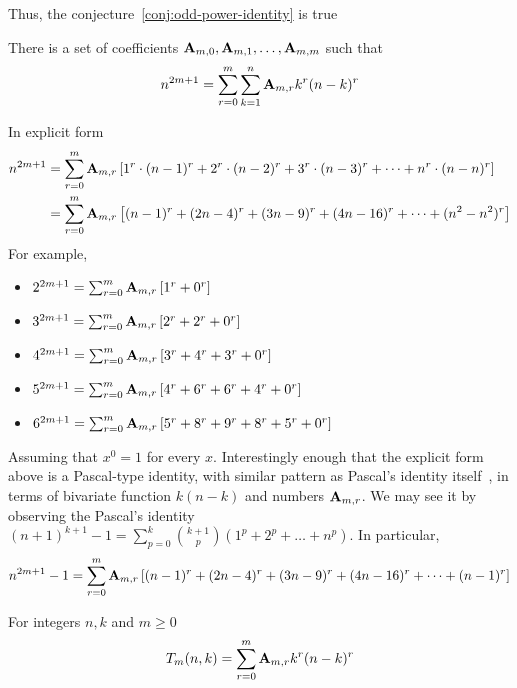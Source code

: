 Thus, the conjecture~\eqref{conj:odd-power-identity} is true

\begin{theorem}
    \label{theorem:odd-power-identity}
    There is a set of coefficients ${\mathbf{A}} \sb{m,0}, {\mathbf{A}} \sb{m,1}, \ldots, {\mathbf{A}} \sb{m,m}$ such that
    \begin{align*}
        n^{2m+1} = \sum_{r=0}^{m} \sum_{k=1}^{n} {\mathbf{A}} \sb{m,r} k^r (n-k)^r
    \end{align*}
\end{theorem}
In explicit form
\begin{align*}
    n^{2m+1} &= \sum_{r=0}^{m} {\mathbf{A}} \sb{m,r} \left[ 1^r \cdot (n-1)^r + 2^r \cdot (n-2)^r + 3^r \cdot (n-3)^r + \cdots + n^r \cdot (n-n)^r  \right] \\
             &= \sum_{r=0}^{m} {\mathbf{A}} \sb{m,r} \left[ (n-1)^r + (2n-4)^r + (3n-9)^r + (4n-16)^r + \cdots +  (n^2-n^2)^r  \right]
\end{align*}
For example,
\begin{itemize}
    \item $2^{2m+1} = \sum_{r=0}^{m} {\mathbf{A}} \sb{m,r} \left[ 1^r + 0^r  \right]$
    \item $3^{2m+1} = \sum_{r=0}^{m} {\mathbf{A}} \sb{m,r} \left[ 2^r + 2^r + 0^r  \right]$
    \item $4^{2m+1} = \sum_{r=0}^{m} {\mathbf{A}} \sb{m,r} \left[ 3^r + 4^r + 3^r + 0^r  \right]$
    \item $5^{2m+1} = \sum_{r=0}^{m} {\mathbf{A}} \sb{m,r} \left[ 4^r + 6^r + 6^r + 4^r + 0^r  \right]$
    \item $6^{2m+1} = \sum_{r=0}^{m} {\mathbf{A}} \sb{m,r} \left[ 5^r + 8^r + 9^r + 8^r + 5^r + 0^r  \right]$
\end{itemize}
Assuming that $x^0=1$ for every $x$.
Interestingly enough that the explicit form above is a Pascal-type identity,
with similar pattern as Pascal's identity itself~\cite{macmillan2011proofs},
in terms of bivariate function $k(n-k)$ and numbers ${\mathbf{A}} \sb{m,r}$.
We may see it by observing the Pascal's identity $(n+1)^{k+1}-1=\sum _{p=0}^{k}{\binom {k+1}{p}}(1^{p}+2^{p}+\dots +n^{p})$.
In particular,
\begin{align*}
    n^{2m+1} - 1
    = \sum_{r=0}^{m} {\mathbf{A}} \sb{m,r} \left[ (n-1)^r + (2n-4)^r + (3n-9)^r + (4n-16)^r + \cdots +  (n-1)^r  \right]
\end{align*}
\begin{definition}
    For integers $n,k$ and $m \geq 0$
    \label{def:bivariate-sum-Tm}
    \begin{align*}
        T_{m}(n,k) = \sum_{r=0}^{m} {\mathbf{A}} \sb{m,r} k^r (n-k)^r
    \end{align*}
\end{definition}

